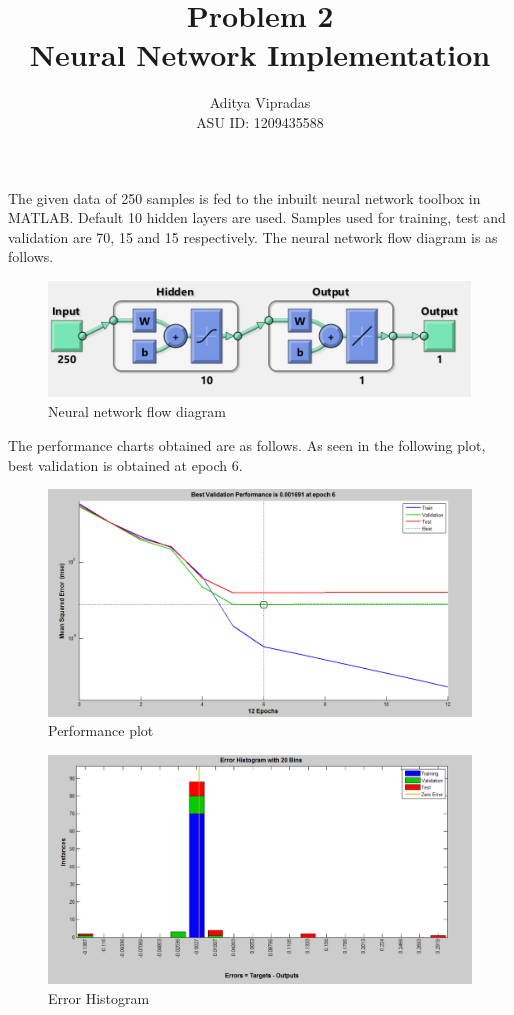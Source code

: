 \documentclass[12pt]{article}
\title{\textbf{Problem 2\\Neural Network Implementation}}
\author{Aditya Vipradas\\ASU ID: 1209435588}
\begin{document}
\maketitle
The given data of 250 samples is fed to the inbuilt neural network toolbox in MATLAB. Default 10 hidden layers are used. Samples used for training, test and validation are 70, 15 and 15 respectively. The neural network flow diagram is as follows.
\begin{figure}[H]
\begin{center}
\includegraphics[scale=0.4]{nn0.jpg}
\caption{Neural network flow diagram}  
\end{center}
\end{figure}
The performance charts obtained are as follows. As seen in the following plot, best validation is obtained at epoch 6.
\begin{figure}[H]
\begin{center}
\includegraphics[scale=0.4]{nn1.jpg}
\caption{Performance plot}  
\end{center}
\end{figure}
\begin{figure}[H]
\begin{center}
\includegraphics[scale=0.4]{nn2.jpg}
\caption{Error Histogram}  
\end{center}
\end{figure}
\end{document}
